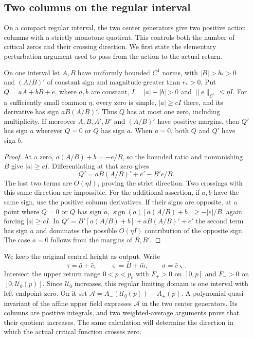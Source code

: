 \subsection{Two columns on the regular interval}

On a compact regular interval, the two center generators give two
positive action columns with a strictly monotone quotient. This controls
both the number of critical zeros and their crossing direction. We first
state the elementary perturbation argument used to pass from the action
to the actual return.

\begin{lemma}
\label{rw:atlas:two-columns}
On one interval let $A,B$ have uniformly bounded $C^1$ norms, with
$|B|>b_*>0$ and $(A/B)'$ of constant sign and magnitude greater
than $r_*>0$. Put $Q=aA+bB+e$, where $a,b$ are constant,
$I=|a|+|b|>0$ and $\|e\|_{C^1}\le\eta I$.
For a sufficiently small common $\eta$, every zero is simple,
$|a|\ge cI$ there, and its derivative has sign
$aB(A/B)'$. Thus $Q$ has at most one zero, including multiplicity.
If moreover $A,B,A',B'$ and $(A/B)'$ have positive margins, then
$Q'$ has sign $a$ wherever $Q=0$ or $Q$ has sign $a$.
When $a=0$, both $Q$ and $Q'$ have sign $b$.
\end{lemma}
\begin{proof}
At a zero, $a(A/B)+b=-e/B$, so the bounded ratio and nonvanishing
$B$ give $|a|\ge cI$. Differentiating at that zero gives
\[
 Q'=aB(A/B)'+e'-B'e/B.
\]
The last two terms are $O(\eta I)$, proving the strict direction.
Two crossings with this same direction are impossible.
For the additional assertion, if $a,b$ have the same sign, use the
positive column derivatives. If their signs are opposite, at a point
where $Q=0$ or $Q$ has sign $a$,
$\operatorname{sign}(a)[a(A/B)+b]\ge-|e|/B$, again forcing
$|a|\ge cI$. In
$Q'=B'[a(A/B)+b]+aB(A/B)'+e'$ the second term has sign $a$ and dominates the possible
$O(\eta I)$ contribution of the opposite sign. The case $a=0$ follows from
the margins of $B,B'$.
\end{proof}

We keep the original central height as output. Write
\[
 \tau=\bar a+\bar c,\qquad
 \varsigma=\bar B+\bar m,\qquad \sigma=\bar c\varsigma.
\]
Intersect the upper return range $0<p<p_c$ with $F_+>0$ on
$[0,p]$ and $F_->0$ on $[0,\mathcal U_0(p)]$. Since
$\mathcal U_0$ increases, this regular limiting domain is one interval
with left endpoint zero. On it set
$\mathcal A=A_-(\mathcal U_0(p))-A_+(p)$.
A polynomial quasi-invariant of the affine upper field expresses
$\mathcal A$ in the two center generators. Its columns are positive
integrals, and two weighted-average arguments prove that their quotient
increases. The same calculation will determine the direction in which
the actual critical function crosses zero.

